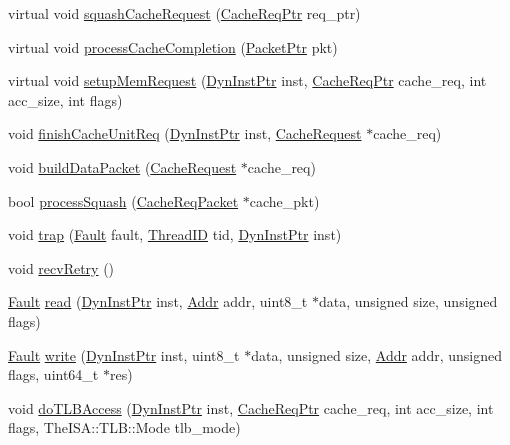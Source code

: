 \begin{DoxyCompactItemize}
\item 
virtual void \hyperlink{classCacheUnit_ac2831520eb121be08811b040992f416b}{squashCacheRequest} (\hyperlink{classCacheRequest}{CacheReqPtr} req\_\-ptr)
\item 
virtual void \hyperlink{classCacheUnit_a3dc029c2e87eb911352b82ff15c86236}{processCacheCompletion} (\hyperlink{classPacket}{PacketPtr} pkt)
\item 
virtual void \hyperlink{classCacheUnit_aa942d730ea26d41b72db771cc951f51e}{setupMemRequest} (\hyperlink{classRefCountingPtr}{DynInstPtr} inst, \hyperlink{classCacheRequest}{CacheReqPtr} cache\_\-req, int acc\_\-size, int flags)
\item 
void \hyperlink{classCacheUnit_aea41ebe99227291877a80081e9b47822}{finishCacheUnitReq} (\hyperlink{classRefCountingPtr}{DynInstPtr} inst, \hyperlink{classCacheRequest}{CacheRequest} $\ast$cache\_\-req)
\item 
void \hyperlink{classCacheUnit_ad661f2bbc47ffa00d06636041132af20}{buildDataPacket} (\hyperlink{classCacheRequest}{CacheRequest} $\ast$cache\_\-req)
\item 
bool \hyperlink{classCacheUnit_a251d965e889d9bfeeb0f36bc4411d86f}{processSquash} (\hyperlink{classCacheReqPacket}{CacheReqPacket} $\ast$cache\_\-pkt)
\item 
void \hyperlink{classCacheUnit_abf76d6d245f7d3b17d26ea8dcc0cf36f}{trap} (\hyperlink{classRefCountingPtr}{Fault} fault, \hyperlink{base_2types_8hh_ab39b1a4f9dad884694c7a74ed69e6a6b}{ThreadID} tid, \hyperlink{classRefCountingPtr}{DynInstPtr} inst)
\item 
void \hyperlink{classCacheUnit_a29cb5a4f98063ce6e9210eacbdb35298}{recvRetry} ()
\item 
\hyperlink{classRefCountingPtr}{Fault} \hyperlink{classCacheUnit_ac48fe45ef23fddfa02b5136cda4c060e}{read} (\hyperlink{classRefCountingPtr}{DynInstPtr} inst, \hyperlink{base_2types_8hh_af1bb03d6a4ee096394a6749f0a169232}{Addr} addr, uint8\_\-t $\ast$data, unsigned size, unsigned flags)
\item 
\hyperlink{classRefCountingPtr}{Fault} \hyperlink{classCacheUnit_abd0bcff6bbdb03d0ad191f96774e8a8b}{write} (\hyperlink{classRefCountingPtr}{DynInstPtr} inst, uint8\_\-t $\ast$data, unsigned size, \hyperlink{base_2types_8hh_af1bb03d6a4ee096394a6749f0a169232}{Addr} addr, unsigned flags, uint64\_\-t $\ast$res)
\item 
void \hyperlink{classCacheUnit_a88205381d7b3d93f930cac7bacc96022}{doTLBAccess} (\hyperlink{classRefCountingPtr}{DynInstPtr} inst, \hyperlink{classCacheRequest}{CacheReqPtr} cache\_\-req, int acc\_\-size, int flags, TheISA::TLB::Mode tlb\_\-mode)

\end{DoxyCompactItemize}
